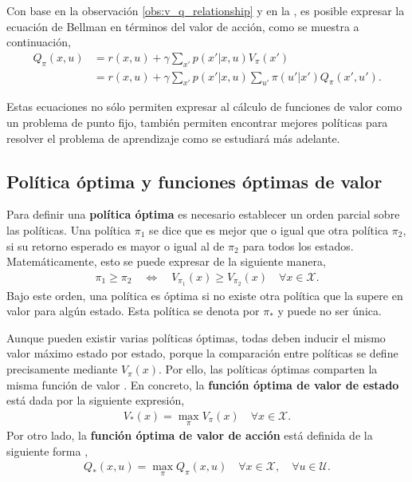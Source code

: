 Con base en la observación \ref{obs:v_q_relationship} y en la , es posible expresar la ecuación de Bellman en términos del valor de acción, como se muestra a continuación,
\begin{equation}
    \begin{aligned}
    Q_{\pi}(x, u) &= r(x,u) + \gamma \sum_{x'}p(x'|x,u)V_{\pi}(x') \\
    &= r(x,u) + \gamma \sum_{x'}p(x'|x,u)\sum_{u'}\pi(u'|x')Q_{\pi}(x', u').
\end{aligned}
\end{equation}

Estas ecuaciones no sólo permiten expresar al cálculo de funciones de valor como un problema de punto fijo, también permiten encontrar mejores políticas para resolver el problema de aprendizaje como se estudiará más adelante.

\subsection{Política óptima y funciones óptimas de valor}

Para definir una \textbf{política óptima} es necesario establecer un orden parcial sobre las políticas. Una política $\pi_1$ se dice que es mejor que o igual que otra política $\pi_2$, si su retorno esperado es mayor o igual al de $\pi_2$ para todos los estados. Matemáticamente, esto se puede expresar de la siguiente manera,
\begin{align}
    \pi_1 \geq \pi_2 \quad \iff \quad V_{\pi_1}(x) \geq V_{\pi_2}(x) \quad \forall x \in \mathcal{X}.    
\end{align}
Bajo este orden, una política es óptima si no existe otra política que la supere en valor para algún estado. Esta política se denota por $\pi_{*}$ y puede no ser única. \cite{Sutton2018}

Aunque pueden existir varias políticas óptimas, todas deben inducir el mismo valor máximo estado por estado, porque la comparación entre políticas se define precisamente mediante $V_{\pi}(x)$. Por ello, las políticas óptimas comparten la misma función de valor \cite{Sutton2018}. En concreto, la \textbf{función óptima de valor de estado} está dada por la siguiente expresión,
\begin{align}
    V_{*}(x) = \max_{\pi}V_{\pi}(x) \quad \forall x \in \mathcal{X}.
\end{align}
Por otro lado, la \textbf{función óptima de valor de acción} está definida de la siguiente forma \cite{Sutton2018},
\begin{align}
Q_{*}(x, u) = \max_{\pi}Q_{\pi}(x,u) \quad \forall x \in \mathcal{X}, \quad \forall u \in \mathcal{U}.
\label{eq:optimal_Q}
\end{align}

